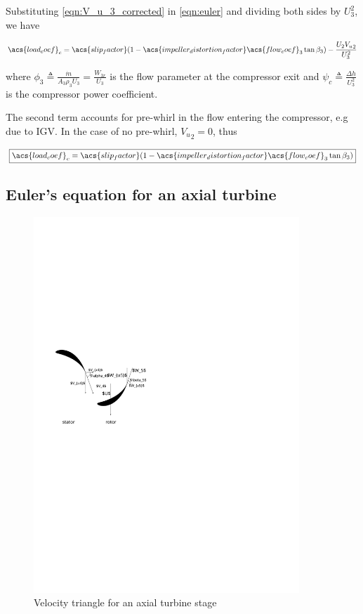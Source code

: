 \documentclass[tcc]{subfiles}
\begin{document}
Substituting \cref{eqn:V_u_3_corrected} in \cref{eqn:euler} and dividing both sides by ${U_3^2}$, we have

\begin{equation}
    \acs{load_coef}_c = \acs{slip_factor}(1-\acs{impeller_distortion_factor}\acs{flow_coef}_3\tan\beta_3) - \frac{U_2 {V_u}_2}{U_3^2} 
\end{equation}

where $\phi_3 \triangleq \frac{\dot{m}}{A_3 \rho_3 U_3} = \frac{W_{3r}}{U_3}$ is the flow parameter at the compressor exit
and $\psi_c \triangleq \frac{\Delta h}{U_3^2}$ is the compressor power coefficient.

The second term accounts for pre-whirl in the flow entering the compressor, e.g due to \ac{IGV}.
In the case of no pre-whirl, ${V_u}_2 = 0$, thus 

\begin{equation}
    \label{eqn:euler}
    \boxed{\acs{load_coef}_c = \acs{slip_factor}(1-\acs{impeller_distortion_factor}\acs{flow_coef}_3\tan\beta_3)}
\end{equation}

\subsection{Euler's equation for an axial turbine}
\begin{figure}
    \centering
    \includegraphics[width=10cm]{fig/turbine_euler}
    \caption{Velocity triangle for an axial turbine stage}
    \label{fig:turbine_euler}
\end{figure}
\end{document}
